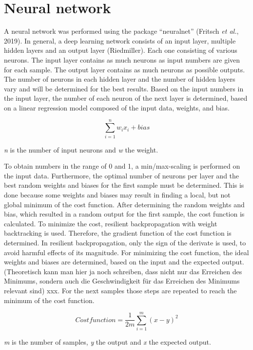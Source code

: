 \documentclass[
  parskip,
  oneside]{scrreprt}
\begin{document}
\hypertarget{neural-network}{%
\section{Neural network}\label{neural-network}}

A neural network was performed using the package ``neuralnet'' (Fritsch
\emph{et al.}, 2019). In general, a deep learning network consists of an
input layer, multiple hidden layers and an output layer (Riedmiller).
Each one consisting of various neurons. The input layer contains as much
neurons as input numbers are given for each sample. The output layer
contains as much neurons as possible outputs. The number of neurons in
each hidden layer and the number of hidden layers vary and will be
determined for the best results. Based on the input numbers in the input
layer, the number of each neuron of the next layer is determined, based
on a linear regression model composed of the input data, weights, and
bias.

\[
\sum_{i=1} ^{n} w_i x_i + bias
\]

\emph{n} is the number of input neurons and \emph{w} the weight.

To obtain numbers in the range of 0 and 1, a min/max-scaling is
performed on the input data. Furthermore, the optimal number of neurons
per layer and the best random weights and biases for the first sample
must be determined. This is done because some weights and biases may
result in finding a local, but not global minimum of the cost function.
After determining the random weights and bias, which resulted in a
random output for the first sample, the cost function is calculated. To
minimize the cost, resilient backpropagation with weight backtracking is
used. Therefore, the gradient function of the cost function is
determined. In resilient backpropagation, only the sign of the derivate
is used, to avoid harmful effects of its magnitude. For minimizing the
cost function, the ideal weights and biases are determined, based on the
input and the expected output. (Theoretisch kann man hier ja noch
schreiben, dass nicht nur das Erreichen des Minimums, sondern auch die
Geschwindigkeit für das Erreichen des Minimums relevant sind) xxx. For
the next samples those steps are repeated to reach the minimum of the
cost function.

\[
Cost function = \frac {1}{2m} \sum_{i=1} ^{m} (x - y)^2
\]

\emph{m} is the number of samples, \emph{y} the output and \emph{x} the
expected output.
\end{document}
